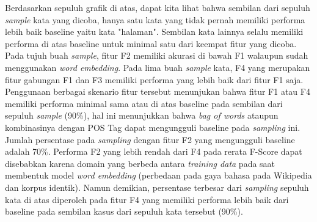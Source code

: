 Berdasarkan sepuluh grafik di atas, dapat kita lihat bahwa sembilan dari sepuluh \textit{sample} kata yang dicoba, hanya satu kata yang tidak pernah memiliki performa lebih baik baseline yaitu kata "halaman". Sembilan kata lainnya selalu memiliki performa di atas baseline untuk minimal satu dari keempat fitur yang dicoba. Pada tujuh buah \textit{sample}, fitur F2 memiliki akurasi di bawah F1 walaupun sudah menggunakan \textit{word embedding}. Pada lima buah \textit{sample} kata, F4 yang merupakan fitur gabungan F1 dan F3 memiliki performa yang lebih baik dari fitur F1 saja. Penggunaan berbagai skenario fitur tersebut menunjukan bahwa fitur F1 atau F4 memiliki performa minimal sama atau di atas baseline pada sembilan dari sepuluh \textit{sample} (90\%), hal ini menunjukkan bahwa \textit{bag of words} ataupun kombinasinya dengan POS Tag dapat mengungguli baseline pada \textit{sampling} ini. Jumlah persentase pada \textit{sampling} dengan fitur F2 yang mengungguli baseline adalah 70\%. Performa F2 yang lebih rendah dari F4 pada rerata F-Score dapat disebabkan karena domain yang berbeda antara \textit{training data} pada saat membentuk model \textit{word embedding} (perbedaan pada gaya bahasa pada Wikipedia dan korpus identik). Namun demikian, persentase terbesar dari \textit{sampling} sepuluh kata di atas diperoleh pada fitur F4 yang memiliki performa lebih baik dari baseline pada sembilan kasus dari sepuluh kata tersebut (90\%).